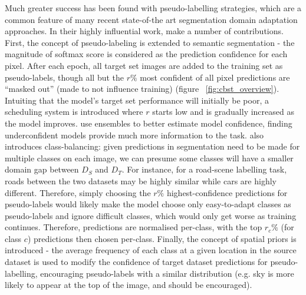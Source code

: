 \documentclass[a4paper,12pt]{report}
\begin{document}
    Much greater success has been found with pseudo-labelling strategies, which are a common feature of many recent state-of-the art segmentation domain adaptation approaches. In their highly influential work, \cite{zou_domain_2018} make a number of contributions. First, the concept of pseudo-labeling is extended to semantic segmentation - the magnitude of softmax score is considered as the prediction confidence for each pixel. After each epoch, all target set images are added to the training set as pseudo-labels, though all but the $r\%$ most confident of all pixel predictions are “masked out” (made to not influence training) (figure ~\ref{fig:cbst_overview}). Intuiting that the model’s target set performance will initially be poor, a scheduling system is introduced where $r$ starts low and is gradually increased as the model improves. \cite{kamnitsas_transductive_2021} use ensembles to better estimate model confidence, finding underconfident models provide much more information to the task. \cite{zou_domain_2018} also introduces class-balancing: given predictions in segmentation need to be made for multiple classes on each image, we can presume some classes will have a smaller domain gap between $D_S$ and $D_T$. For instance, for a road-scene labelling task, roads between the two datasets may be highly similar while cars are highly different. Therefore, simply choosing the $r\%$ highest-confidence predictions for pseudo-labels would likely make the model choose only easy-to-adapt classes as pseudo-labels and ignore difficult classes, which would only get worse as training continues. Therefore, predictions are normalised per-class, with the top $r_c\%$ (for class $c$) predictions then chosen per-class. Finally, the concept of spatial priors is introduced - the average frequency of each class at a given location in the source dataset is used to modify the confidence of target dataset predictions for pseudo-labelling, encouraging pseudo-labels with a similar distribution (e.g. sky is more likely to appear at the top of the image, and should be encouraged). 
    
\end{document}
